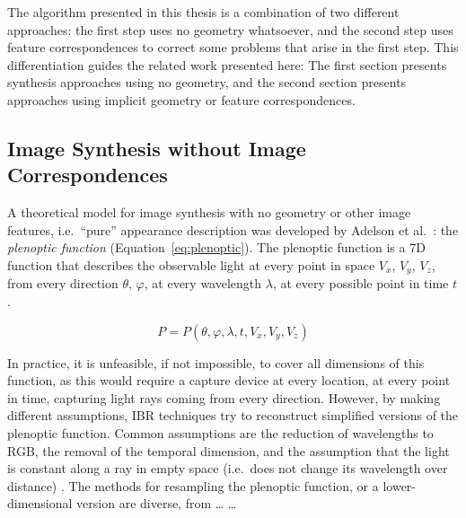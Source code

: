The algorithm presented in this thesis is a combination of two different approaches: the first step uses no geometry whatsoever, and the second step uses feature correspondences to correct some problems that arise in the first step. This differentiation guides the related work presented here: The first section presents synthesis approaches using no geometry, and the second section presents approaches using implicit geometry or feature correspondences.


\subsection{Image Synthesis without Image Correspondences}
A theoretical model for image synthesis with no geometry or other image features, i.e.\ ``pure'' appearance description was developed by Adelson et al.\ \cite{Adelson91}: the \emph{plenoptic function} (Equation~\ref{eq:plenoptic}). The plenoptic function is a 7D function that describes the observable light at every point in space $V_x$, $V_y$, $V_z$, from every direction $\theta$, $\varphi$, at every wavelength $\lambda$, at every possible point in time $t$.

\begin{equation}
  \label{eq:plenoptic}
  P = P(\theta, \varphi, \lambda, t, V_x, V_y, V_z)
\end{equation}

In practice, it is unfeasible, if not impossible, to cover all dimensions of this function, as this would require a capture device at every location, at every point in time, capturing light rays coming from every direction. However, by making different assumptions, IBR techniques try to reconstruct simplified versions of the plenoptic function. Common assumptions are the reduction of wavelengths to RGB, the removal of the temporal dimension, and the assumption that the light is constant along a ray in empty space (i.e.\ does not change its wavelength over distance) \cite{survey2004}. The methods for resampling the plenoptic function, or a lower-dimensional version are diverse, from \ldots \cite{lightfield} \ldots 

